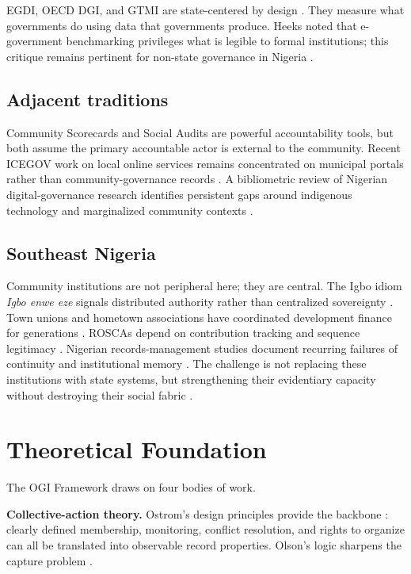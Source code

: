\documentclass[sigconf,anonymous]{acmart}
\begin{document}
EGDI, OECD DGI, and GTMI are state-centered by design \cite{un2024,oecd2024,wb2025}. They measure what governments do using data that governments produce. Heeks \cite{heeks2006} noted that e-government benchmarking privileges what is legible to formal institutions; this critique remains pertinent for non-state governance in Nigeria \cite{heeks2002,heeks2003}.

\subsection{Adjacent traditions}

Community Scorecards \cite{singh2003} and Social Audits \cite{gaventa2013} are powerful accountability tools, but both assume the primary accountable actor is external to the community. Recent ICEGOV work on local online services remains concentrated on municipal portals rather than community-governance records \cite{guimaraes2025,kabanov2025}. A bibliometric review of Nigerian digital-governance research identifies persistent gaps around indigenous technology and marginalized community contexts \cite{ishola2025}.

\subsection{Southeast Nigeria}

Community institutions are not peripheral here; they are central. The Igbo idiom \textit{Igbo enwe eze} signals distributed authority rather than centralized sovereignty \cite{okafor2019}. Town unions and hometown associations have coordinated development finance for generations \cite{harneit2006,uduku2002}. ROSCAs depend on contribution tracking and sequence legitimacy \cite{ardener1964,besley1993,bouman1995}. Nigerian records-management studies document recurring failures of continuity and institutional memory \cite{adebayo2018}. The challenge is not replacing these institutions with state systems, but strengthening their evidentiary capacity without destroying their social fabric \cite{nwangwu2024}.

\section{Theoretical Foundation}

The OGI Framework draws on four bodies of work.

\textbf{Collective-action theory.} Ostrom's design principles provide the backbone \cite{ostrom1990}: clearly defined membership, monitoring, conflict resolution, and rights to organize can all be translated into observable record properties. Olson's logic sharpens the capture problem \cite{olson1965}.
\end{document}

